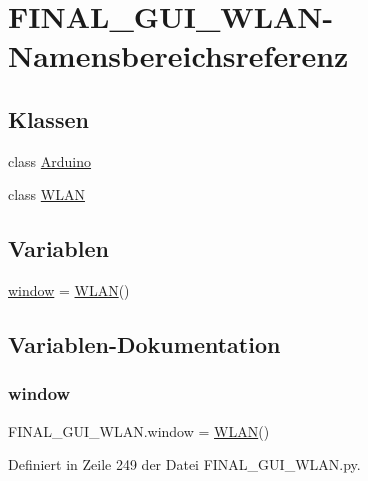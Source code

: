 \hypertarget{namespace_f_i_n_a_l___g_u_i___w_l_a_n}{}\section{F\+I\+N\+A\+L\+\_\+\+G\+U\+I\+\_\+\+W\+L\+A\+N-\/\+Namensbereichsreferenz}
\label{namespace_f_i_n_a_l___g_u_i___w_l_a_n}
\subsection*{Klassen}
\begin{DoxyCompactItemize}
\item 
class \hyperlink{class_f_i_n_a_l___g_u_i___w_l_a_n_1_1_arduino}{Arduino}
\item 
class \hyperlink{class_f_i_n_a_l___g_u_i___w_l_a_n_1_1_w_l_a_n}{W\+L\+AN}
\end{DoxyCompactItemize}
\subsection*{Variablen}
\begin{DoxyCompactItemize}
\item 
\hyperlink{namespace_f_i_n_a_l___g_u_i___w_l_a_n_ace49c6e031d3bddfe51aef1314e55222}{window} = \hyperlink{class_f_i_n_a_l___g_u_i___w_l_a_n_1_1_w_l_a_n}{W\+L\+AN}()
\end{DoxyCompactItemize}


\subsection{Variablen-\/\+Dokumentation}
\mbox{\label{namespace_f_i_n_a_l___g_u_i___w_l_a_n_ace49c6e031d3bddfe51aef1314e55222}} 
\subsubsection{\texorpdfstring{window}{window}}
{\footnotesize\ttfamily F\+I\+N\+A\+L\+\_\+\+G\+U\+I\+\_\+\+W\+L\+A\+N.\+window = \hyperlink{class_f_i_n_a_l___g_u_i___w_l_a_n_1_1_w_l_a_n}{W\+L\+AN}()}



Definiert in Zeile 249 der Datei F\+I\+N\+A\+L\+\_\+\+G\+U\+I\+\_\+\+W\+L\+A\+N.\+py.

